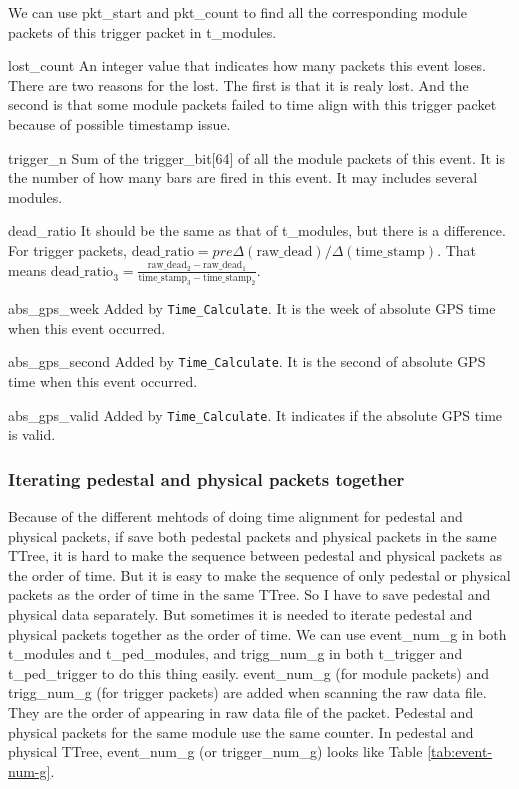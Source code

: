 \documentclass[a4paper, 12pt, onecolumn]{article}
\begin{document}
\begin{asparadesc}
  We can use pkt\_start and pkt\_count to find all the corresponding module packets of this trigger packet in t\_modules.
\item[lost\_count] An integer value that indicates how many packets this event loses. There are two reasons for the lost.
  The first is that it is realy lost. And the second is that some module packets failed to time align with this trigger packet because of possible timestamp issue.
\item[trigger\_n] Sum of the trigger\_bit[64] of all the module packets of this event. It is the number of how many bars are fired in this event. It may includes several modules.
\item[dead\_ratio] It should be the same as that of t\_modules, but there is a difference. For trigger packets,
  $\textrm{dead\_ratio} = pre\Delta(\textrm{raw\_dead}) / \Delta(\textrm{time\_stamp})$.
  That means $\textrm{dead\_ratio}_3 = \frac{\textrm{raw\_dead}_2 - \textrm{raw\_dead}_1}{\textrm{time\_stamp}_3 - \textrm{time\_stamp}_2}$.
\item[abs\_gps\_week] Added by \texttt{Time\_Calculate}. It is the week of absolute GPS time when this event occurred.
\item[abs\_gps\_second] Added by \texttt{Time\_Calculate}. It is the second of absolute GPS time when this event occurred.
\item[abs\_gps\_valid] Added by \texttt{Time\_Calculate}. It indicates if the absolute GPS time is valid.
\end{asparadesc}

\subsubsection{Iterating pedestal and physical packets together}
Because of the different mehtods of doing time alignment for pedestal and physical packets, if save both pedestal packets and physical packets in the same TTree,
it is hard to make the sequence between pedestal and physical packets as the order of time.
But it is easy to make the sequence of only pedestal or physical packets as the order of time in the same TTree.
So I have to save pedestal and physical data separately.
But sometimes it is needed to iterate pedestal and physical packets together as the order of time.
We can use event\_num\_g in both t\_modules and t\_ped\_modules, and trigg\_num\_g in both t\_trigger and t\_ped\_trigger to do this thing easily.
event\_num\_g (for module packets) and trigg\_num\_g (for trigger packets) are added when scanning the raw data file.
They are the order of appearing in raw data file of the packet. Pedestal and physical packets for the same module use the same counter.
In pedestal and physical TTree, event\_num\_g (or trigger\_num\_g) looks like Table \ref{tab:event-num-g}.
\end{document}
